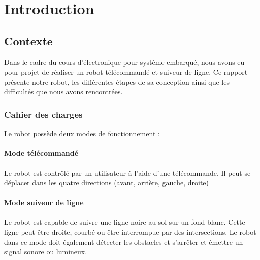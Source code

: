 \chapter{Introduction}

\section{Contexte}

Dans le cadre du cours d'électronique pour système embarqué,
nous avons eu pour projet de réaliser un robot télécommandé et suiveur de ligne.
Ce rapport présente notre robot, les différentes étapes de sa conception ainsi que les difficultés que nous avons rencontrées.


\subsection{Cahier des charges}

Le robot possède deux modes de fonctionnement :

\subsubsection{Mode télécommandé}

Le robot est contrôlé par un utilisateur à l'aide d'une télécommande.
Il peut se déplacer dans les quatre directions (avant, arrière, gauche, droite)

\subsubsection{Mode suiveur de ligne}

Le robot est capable de suivre une ligne noire au sol sur un fond blanc.
Cette ligne peut être droite, courbé ou être interrompue par des intersections.
Le robot dans ce mode doit également détecter les obstacles et s'arrêter et émettre un signal sonore ou lumineux.
